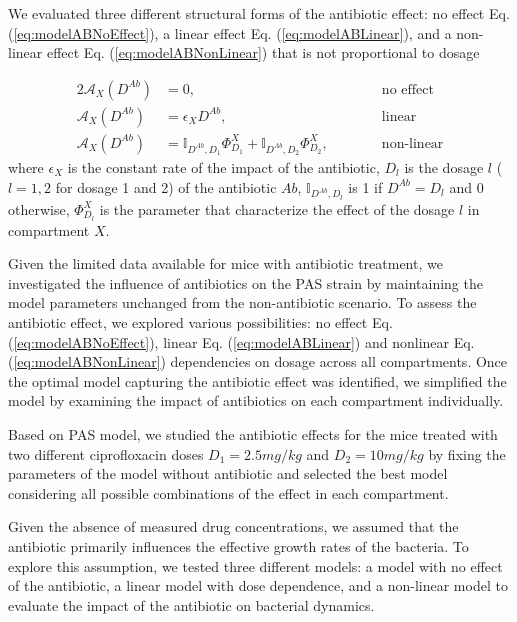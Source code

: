 \documentclass{article}
\begin{document}
We evaluated three different structural forms of the antibiotic effect: no effect Eq. (\ref{eq:modelABNoEffect}), a linear effect Eq. (\ref{eq:modelABLinear}), and a non-linear effect Eq. (\ref{eq:modelABNonLinear}) that is not proportional to dosage

\begin{alignat}{2}
	\mathcal{A}_{X}(D^{Ab}) &= 0, &\quad\quad\quad \text{no effect} \label{eq:modelABNoEffect} \\
	\mathcal{A}_{X}(D^{Ab}) &= \epsilon_{X} D^{Ab}, &\quad\quad\quad \text{linear} \label{eq:modelABLinear}\\
	\mathcal{A}_{X}(D^{Ab}) &= \mathbb{I}_{D^{Ab},D_1} \Phi_{D_1}^{X} + \mathbb{I}_{D^{Ab},D_2} \Phi_{D_2}^{X}, &\quad\quad\quad \text{non-linear} \label{eq:modelABNonLinear} 
\end{alignat}
where $\epsilon_{X}$  is the constant rate of the impact of the antibiotic, $D_l$ is the dosage $l$ ($l=1,2$ for dosage 1 and 2) of the antibiotic $Ab$, $\mathbb{I}_{D^{Ab},D_l}$ is 1 if $D^{Ab} = D_l$ and 0 otherwise, $\Phi_{D_l}^{X}$ is the parameter that characterize the effect of the dosage $l$ in compartment $X$.

Given the limited data available for mice with antibiotic treatment, we investigated the influence of antibiotics on the PAS strain by maintaining the model parameters unchanged from the non-antibiotic scenario. To assess the antibiotic effect, we explored various possibilities: no effect Eq. (\ref{eq:modelABNoEffect}), linear Eq. (\ref{eq:modelABLinear}) and nonlinear Eq. (\ref{eq:modelABNonLinear}) dependencies on dosage across all compartments. Once the optimal model capturing the antibiotic effect was identified, we simplified the model by examining the impact of antibiotics on each compartment individually.


Based on PAS model, we studied the antibiotic effects for the mice treated with two different ciprofloxacin doses $D_1 = 2.5 mg/kg $ and $D_2 = 10 mg/kg$ by fixing the parameters of the model without antibiotic and selected the best model considering all possible combinations of the effect in each compartment.





 Given the absence of measured drug concentrations, we assumed that the antibiotic primarily influences the effective growth rates of the bacteria. To explore this assumption, we tested three different models: a model with no effect of the antibiotic, a linear model with dose dependence, and a non-linear model to evaluate the impact of the antibiotic on bacterial dynamics.
\end{document}
